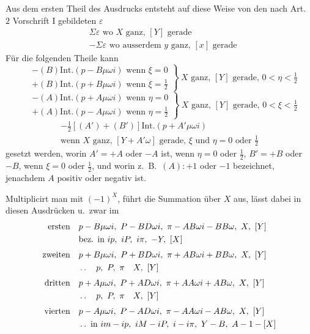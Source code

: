 Aus dem ersten Theil des Ausdrucks entsteht auf diese Weise von den nach Art.\ $2$ Vorschrift I gebildeten $\varepsilon$
\[
\begin{aligned}
&\Sigma\varepsilon\text{ wo }X\text{ ganz, }[Y]\text{ gerade}\\
&-\Sigma\varepsilon\text{ wo ausserdem }y\text{ ganz, }[x]\text{ gerade}
\end{aligned}
\]
Für die folgenden Theile kann
\[
\left.\begin{aligned}
&-(B)\mathrm{Int.}(p-B\mu\omega i)\text{ wenn }\xi=0\\
&+(B)\mathrm{Int.}(p+B\mu\omega i)\text{ wenn }\xi=\tfrac12
\end{aligned}\right\}\ X\text{ ganz, }[Y]\text{ gerade, }0<\eta<\tfrac12
\]
\[
\left.\begin{aligned}
&-(A)\mathrm{Int.}(p+A\mu\omega i)\text{ wenn }\eta=0\\
&+(A)\mathrm{Int.}(p-A\mu\omega i)\text{ wenn }\eta=\tfrac12
\end{aligned}\right\}\ X\text{ ganz, }[Y]\text{ gerade, }0<\xi<\tfrac12
\]
\[
\begin{gathered}
-\tfrac12[(A')+(B')]\mathrm{Int.}(p+A'\mu\omega i)\\
\text{wenn }X\text{ ganz, }[Y+A'\omega]\text{ gerade, }\xi\text{ und }\eta=0\text{ oder }\tfrac12
\end{gathered}
\]
gesetzt werden, worin $A'=+A$ oder $-A$ ist, wenn $\eta=0$ oder $\tfrac12$, $B'=+B$ oder $-B$, wenn $\xi=0$ oder $\tfrac12$, und worin z.\ B.\ $(A):+1$ oder $-1$ bezeichnet, jenachdem $A$ positiv oder negativ ist.

Multiplicirt man mit $(-1)^X$, führt die Summation über $X$ aus, lässt dabei in diesen Ausdrücken u.\ zwar im
\[
\begin{aligned}
\text{ersten}\quad&p-B\mu\omega i,\ P-BD\omega i,\ \pi-AB\omega i-BB\omega,\ X,\ [Y]\\
&\text{bez. in }ip,\ iP,\ i\pi,\ -Y,\ [X]\\[3pt]
\text{zweiten}\quad&p+B\mu\omega i,\ P+BD\omega i,\ \pi+AB\omega i+BB\omega,\ X,\ [Y]\\
&\mathinner{.\,.}\quad p,\ P,\ \pi\quad X,\ [Y]\\[3pt]
\text{dritten}\quad&p+A\mu\omega i,\ P+AD\omega i,\ \pi+AA\omega i+AB\omega,\ X,\ [Y]\\
&\mathinner{.\,.}\quad p,\ P,\ \pi\quad X,\ [Y]\\[3pt]
\text{vierten}\quad&p-A\mu\omega i,\ P-AD\omega i,\ \pi-AA\omega i-AB\omega,\ X,\ [Y]\\
&\mathinner{.\,.}\text{ in }im-ip,\ iM-iP,\ i-i\pi,\ Y-B,\ A-1-[X]
\end{aligned}
\]


